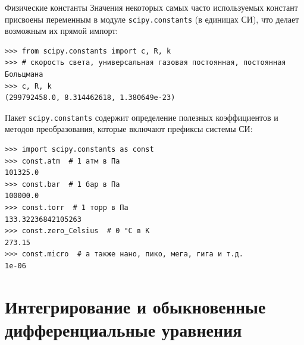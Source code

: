 \documentclass[aspectratio=169, mathserif]{beamer}	%
\begin{document}
\begin{frame}[fragile, label=c]{Физические константы}
\scriptsize
Значения некоторых самых часто используемых констант присвоены переменным в модуле \texttt{scipy.constants} (в единицах СИ), что делает возможным их прямой импорт:
\vfill
\begin{verbatim}
>>> from scipy.constants import c, R, k
>>> # скорость света, универсальная газовая постоянная, постоянная Больцмана
>>> c, R, k
(299792458.0, 8.314462618, 1.380649e-23)
\end{verbatim}
\vfill
Пакет \texttt{scipy.constants} содержит определение полезных коэффициентов и методов преобразования, которые включают префиксы системы СИ:
\vfill
\begin{verbatim}
>>> import scipy.constants as const
>>> const.atm  # 1 атм в Па
101325.0
>>> const.bar  # 1 бар в Па
100000.0
>>> const.torr  # 1 торр в Па
133.32236842105263
>>> const.zero_Celsius  # 0 °C в К
273.15
>>> const.micro  # а также нано, пико, мега, гига и т.д.
1e-06
\end{verbatim}
\vfill
\end{frame}

\section{Интегрирование и обыкновенные \\ дифференциальные уравнения}
\sectionframe
\end{document}
